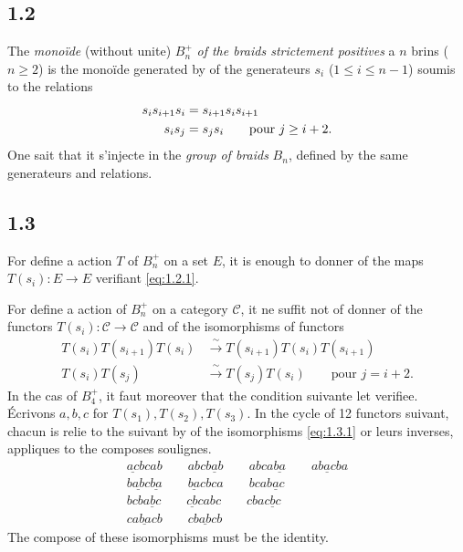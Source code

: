 \documentclass[11pt,a4paper]{article}
\theoremstyle{plain}
\theoremstyle{definition}
\newcommand{\cC}{\mathscr{C}}
\begin{document}
\subsection*{1.2}\label{sec:1.2}

The \emph{mono\"ide} (without unite) $B_n^+$ \emph{of the braids strictement positives} a $n$ brins ($n \geq 2$) is the mono\"ide generated by of the generateurs $s_i$ ($1 \leq i \leq n-1$) soumis to the relations
\begin{align}
s_i s_{i+1} s_i &= s_{i+1} s_i s_{i+1} \label{eq:1.2.1} \\
s_i s_j &= s_j s_i \qquad \text{pour } j \geq i+2. \notag
\end{align}
One sait that it s'injecte in the \emph{group of braids} $B_n$, defined by the same generateurs and relations.

\subsection*{1.3}

For define a action $T$ of $B_n^+$ on a set $E$, it is enough to donner of the maps $T(s_i) : E \to E$ verifiant \eqref{eq:1.2.1}.

For define a action of $B_n^+$ on a category $\cC$, it ne suffit not of donner of the functors $T(s_i) : \cC \to \cC$ and of the isomorphisms of functors
\begin{equation}\label{eq:1.3.1}
\begin{aligned}
T(s_i) T(s_{i+1}) T(s_i) &\xrightarrow{\;\sim\;} T(s_{i+1}) T(s_i) T(s_{i+1}) \\
T(s_i) T(s_j) &\xrightarrow{\;\sim\;} T(s_j) T(s_i) \qquad \text{pour } j = i+2.
\end{aligned}
\tag{1.3.1}
\end{equation}
In the cas of $B_4^+$, it faut moreover that the condition suivante let verifiee. \'Ecrivons $a, b, c$ for $T(s_1), T(s_2), T(s_3)$. In the cycle of 12 functors suivant, chacun is relie to the suivant by of the isomorphisms \eqref{eq:1.3.1} or leurs inverses, appliques to the composes soulignes.
\begin{equation}\label{eq:1.3.2}
\begin{gathered}
\underline{ac}bcab \qquad abc\underline{bab} \qquad abca\underline{ba} \qquad a\underline{bac}ba \\
b\underline{ab}c\underline{ba} \qquad \underline{ba}cbca \qquad bca\underline{bac} \\
bcb\underline{abc} \qquad \underline{cb}cabc \qquad cba\underline{cbc} \\
c\underline{abac}b \qquad c\underline{babc}b
\end{gathered}
\tag{1.3.2}
\end{equation}
The compose of these isomorphisms must be the identity.
\end{document}
